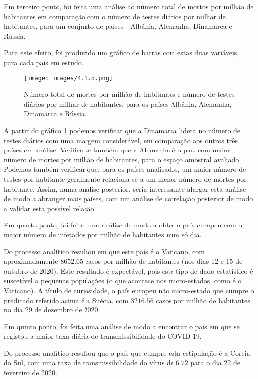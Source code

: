 \documentclass[conference]{IEEEtran}
\begin{document}
Em terceiro ponto, foi feita uma análise ao número total de mortos por milhão de habitantes em comparação com o número de testes diários por milhar de habitantes, para um conjunto de países - Albânia, Alemanha, Dinamarca e Rússia.

Para este efeito, foi produzido um gráfico de barras com estas duas variáveis, para cada país em estudo.

\begin{figure}[h]
    \centering
    \texttt{[image: images/4.1.d.png]}
    \caption{Número total de mortes por milhão de habitantes e número de testes diários por milhar de habitantes, para os países Albânia, Alemanha, Dinamarca e Rússia.}
    \label{fig:4.1.d}
\end{figure}

A partir do gráfico \ref{fig:4.1.d} podemos verificar que a Dinamarca lidera no número de testes diários com uma margem considerável, em comparação aos outros três países em análise. Verifica-se também que a Alemanha é o país com maior número de mortes por milhão de habitantes, para o espaço amostral avaliado. Podemos também verificar que, para os países analisados, um maior número de testes por habitante geralmente relaciona-se a um menor número de mortes por habitante. Assim, numa análise posterior, seria interessante alargar esta análise de modo a abranger mais países, com um análise de correlação posterior de modo a validar esta possível relação

Em quarto ponto, foi feita uma análise de modo a obter o país europeu com o maior número de infetados por milhão de habitantes num só dia.

Do processo analítico resultou em que este país é o Vaticano, com aproximadamente $8652.65$ casos por milhão de habitantes (nos dias 12 e 15 de outubro de 2020). Este resultado é expectável, pois este tipo de dado estatístico é suscetível a pequenas populações (o que acontece nos micro-estados, como é o Vaticano). A título de curiosidade, o país europeu não micro-estado que cumpre o predicado referido acima é a Suécia, com $3216.56$ casos por milhão de habitantes no dia 29 de dezembro de 2020.

Em quinto ponto, foi feita uma análise de modo a encontrar o país em que se registou a maior taxa diária de transmissibilidade do COVID-19.

Do processo analítico resultou que o país que cumpre esta estipulação é a Coreia do Sul, com uma taxa de transmissibilidade do vírus de $6.72$ para o dia 22 de fevereiro de 2020.
\end{document}
